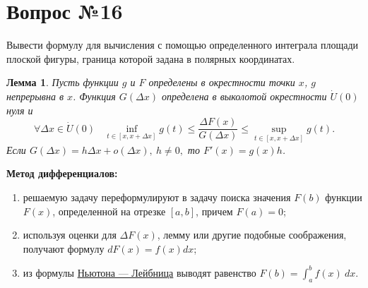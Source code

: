 \documentclass[12pt]{report}
\numberwithin{equation}{section}
\newtheorem{lemma}{Лемма}[section]
\begin{document}
\newpage \section{Вопрос №16} %
\begin{framed}
Вывести формулу для вычисления с помощью определенного интеграла площади плоской
фигуры, граница которой задана в полярных координатах.
\end{framed}

\begin{lemma} \label{lemm:16:1}
Пусть функции $g$ и $F$ определены в окрестности точки $x$, $g$ непрерывна в $x$. Функция $G(\Delta x)$ определена в выколотой окрестности $\dot{U}(0)$ нуля и
\[ \forall \Delta x \in \dot{U}(0)~~~~ \inf_{t \in [x,x + \Delta x]}g(t) \leqslant \frac{\Delta F(x)}{G(\Delta x)} \leqslant \sup_{t \in[x,x + \Delta x]} g(t).\]
Если $G(\Delta x) = h \Delta x + o(\Delta x),~h \neq 0,$ то $F'(x) = g(x)h$.\\
\end{lemma}

\textbf{Метод дифференциалов:}
\begin{enumerate}
\item[1)] решаемую задачу переформулируют в задачу поиска значения $F(b)$ функции $F(x)$, определенной на отрезке $[a,b]$, причем $F(a) = 0$;
\item[2)] используя оценки для $\Delta F(x)$, лемму или другие подобные соображения, получают формулу $dF(x) = f(x)dx$;
\item[3)] из формулы \hyperref[th:11:1]{Ньютона --- Лейбница} выводят равенство $F(b) = \int_a^b f(x)~dx$.\\
\end{enumerate}
\end{document}
